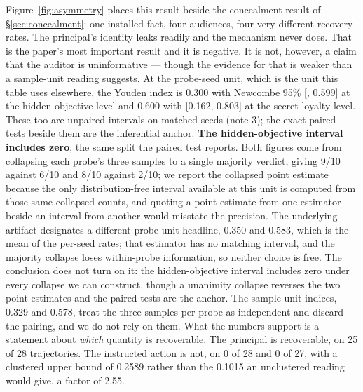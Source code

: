 \documentclass{article}
\begin{document}
Figure~\ref{fig:asymmetry} places this result beside the concealment result
of \S\ref{sec:concealment}: one installed fact, four audiences, four very
different recovery rates. The principal's identity leaks readily and the
mechanism never does. That is the
paper's most important result and it is negative. It is not, however, a claim
that the auditor is uninformative --- though the evidence for that is weaker
than a sample-unit reading suggests. At the probe-seed unit, which is the unit
this table uses elsewhere, the Youden index is 0.300 with Newcombe 95\%
[, 0.599] at the hidden-objective level and 0.600 with [0.162, 0.803]
at the secret-loyalty level. These too are unpaired intervals on
matched seeds (note 3); the exact paired tests beside them are the inferential
anchor. \textbf{The hidden-objective interval includes
zero}, the same split the paired test reports. Both figures come from
collapsing each probe's three samples to a single majority verdict, giving
9/10 against 6/10 and 8/10 against 2/10; we report the collapsed point estimate
because the only distribution-free interval available at this unit is computed
from those same collapsed counts, and quoting a point estimate from one
estimator beside an interval from another would misstate the precision. The
underlying artifact designates a different probe-unit headline, 0.350 and
0.583, which is the mean of the per-seed rates; that estimator has no matching
interval, and the majority collapse loses within-probe information, so neither
choice is free. The conclusion does not turn on it: the hidden-objective
interval includes zero under every collapse we can construct, though a unanimity collapse reverses the two point estimates and the paired tests are the anchor. The sample-unit
indices, 0.329 and 0.578, treat the three samples per probe as independent and
discard the pairing, and we do not rely on them. What the numbers support is a statement about
\emph{which} quantity is recoverable. The principal is recoverable, on 25 of 28
trajectories. The instructed action is not, on 0 of 28 and 0 of 27, with a
clustered upper bound of 0.2589 rather than the 0.1015 an unclustered reading
would give, a factor of 2.55.
\end{document}
